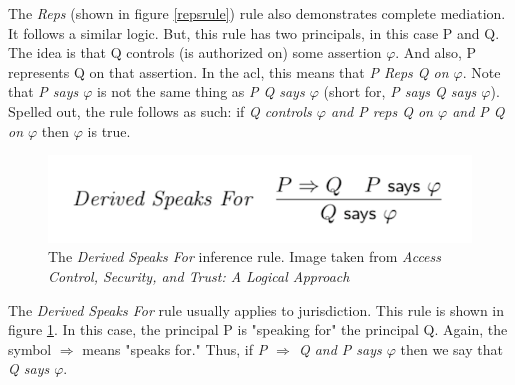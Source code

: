 \documentclass[../../main/main.tex]{subfiles}
\begin{document}
The \textit{Reps} (shown in figure \ref{repsrule}) rule also demonstrates complete mediation.  It follows a similar logic.  But, this rule has two principals, in this case P and Q.  The idea is that Q controls (is authorized on) some assertion $\varphi$. And also, P represents Q on that assertion.  In the \gls{acl}, this means that \textit{P Reps Q on $\varphi$}.  Note that \textit{P says $\varphi$} is not the same thing as \textit{P \textbar Q says $\varphi$} (short for, \textit{P says Q says $\varphi$}).  Spelled out, the rule follows as such: if \textit{Q controls $\varphi$ and P reps Q on $\varphi$ and P \textbar Q on $\varphi$} then $\varphi$ is true.

%
\begin{figure}[h]
\centering
\includegraphics[width =0.6 \textwidth]{../figures/derivedspeaksfor}
\caption{\label{derivedspeaksfor}The \textit{Derived Speaks For} inference rule. Image taken from \textit{Access Control, Security, and Trust: A Logical Approach}\cite{ChinOlder}}
\end{figure}

The \textit{Derived Speaks For} rule usually applies to jurisdiction. This rule is shown in figure \ref{derivedspeaksfor}.  In this case, the principal P is "speaking for" the principal Q.  Again, the symbol $\Rightarrow$ means "speaks for."  Thus, if \textit{P $\Rightarrow$ Q and P says $\varphi$} then we say that \textit{Q says $\varphi$}.

%
\end{document}
